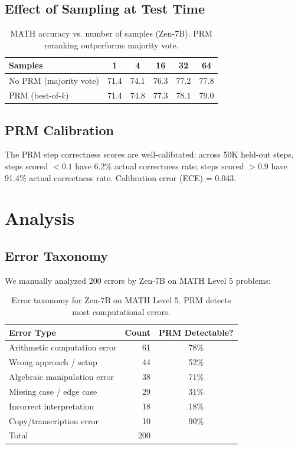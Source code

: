 \documentclass[11pt,a4paper]{article}
\begin{document}
\subsection{Effect of Sampling at Test Time}

\begin{table}[H]
\centering
\begin{tabular}{lccccc}
\toprule
\textbf{Samples} & \textbf{1} & \textbf{4} & \textbf{16} & \textbf{32} & \textbf{64} \\
\midrule
No PRM (majority vote) & 71.4 & 74.1 & 76.3 & 77.2 & 77.8 \\
PRM (best-of-$k$) & 71.4 & 74.8 & 77.3 & 78.1 & 79.0 \\
\bottomrule
\end{tabular}
\caption{MATH accuracy vs. number of samples (Zen-7B). PRM reranking outperforms majority vote.}
\end{table}

\subsection{PRM Calibration}

The PRM step correctness scores are well-calibrated: across 50K held-out steps,
steps scored $<0.1$ have 6.2\% actual correctness rate; steps scored $>0.9$ have
91.4\% actual correctness rate. Calibration error (ECE) = 0.043.

\section{Analysis}

\subsection{Error Taxonomy}

We manually analyzed 200 errors by Zen-7B on MATH Level 5 problems:

\begin{table}[H]
\centering
\begin{tabular}{lrc}
\toprule
\textbf{Error Type} & \textbf{Count} & \textbf{PRM Detectable?} \\
\midrule
Arithmetic computation error & 61 & 78\% \\
Wrong approach / setup & 44 & 52\% \\
Algebraic manipulation error & 38 & 71\% \\
Missing case / edge case & 29 & 31\% \\
Incorrect interpretation & 18 & 18\% \\
Copy/transcription error & 10 & 90\% \\
\midrule
Total & 200 & \\
\bottomrule
\end{tabular}
\caption{Error taxonomy for Zen-7B on MATH Level 5. PRM detects most computational errors.}
\end{table}
\end{document}
